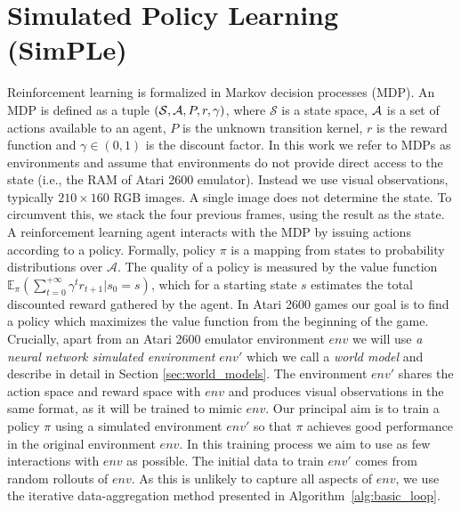 \section{Simulated Policy Learning (SimPLe)}
\label{subsec:model}
\label{sec:mbrl}


Reinforcement learning is formalized in Markov decision processes (MDP). An MDP is defined as a tuple $(\mathcal{S}, {\mathcal A}, P, r, \gamma)$, where $\mathcal{S}$ is a state space, ${\mathcal A}$ is a set of actions available to an agent, $P$ is the unknown transition kernel, $r$ is the reward function and $\gamma\in (0,1)$ is the discount factor. 
In this work we refer to MDPs as environments and assume %
that environments do not provide direct access to the state (i.e., the RAM of Atari 2600 emulator). Instead we use visual observations, typically $210\times 160$ RGB images. A single image does not determine the state. To circumvent this, we stack the four previous frames, using the result as the state.
A reinforcement learning agent interacts with the MDP by issuing actions according to a policy. Formally, policy $\pi$ is a mapping from states to probability distributions over $\mathcal{A}$. The quality of a policy is measured by the value function $\mathbb{E}_{\pi}\left(\sum_{t=0}^{+\infty}\gamma^t r_{t+1}|s_0=s \right)$, which for a starting state $s$ estimates the total discounted reward gathered by the agent. In Atari 2600 games our goal is to find a policy which maximizes the value function from the beginning of the game.
Crucially, apart from an Atari 2600 emulator environment $env$ we will use \textit{a neural network simulated environment} $env'$ which we call a \textit{world model} and describe in detail in Section \ref{sec:world_models}. The environment $env'$ shares the action space and reward space with $env$ and produces visual observations in the same format, as it will be trained to mimic $env$.  Our principal aim is to
train a policy $\pi$ using a simulated environment $env'$ so that $\pi$ achieves good performance in the original environment $env$. In this training process we aim to use as few interactions with $env$ as possible. 
The initial data to train $env'$ comes from random rollouts of $env$. As this is unlikely to capture all aspects of $env$, we use the iterative data-aggregation  method presented in Algorithm~\ref{alg:basic_loop}.

